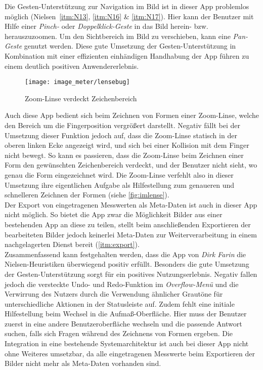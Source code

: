 Die Gesten-Unterstützung zur Navigation im Bild ist in dieser App problemlos möglich (Nielsen~\autoref{itm:N13}, \autoref{itm:N16} \& \autoref{itm:N17}).
Hier kann der Benutzer mit Hilfe einer \emph{Pinch-} oder \emph{Doppelklick-Geste} in das Bild herein- bzw. herauszuzoomen.
Um den Sichtbereich im Bild zu verschieben, kann eine \emph{Pan-Geste} genutzt werden.
Diese gute Umsetzung der Gesten-Unterstützung in Kombination mit einer effizienten einhändigen Handhabung der App führen zu einem deutlich positiven Anwendererlebnis.

\begin{wrapfigure}{R}{0.5\textwidth}
  \centering
  \texttt{[image: image\_meter/lensebug]}
  \caption{Zoom-Linse verdeckt Zeichenbereich}
  \label{fig:imlense}
\end{wrapfigure}

Auch diese App bedient sich beim Zeichnen von Formen einer Zoom-Linse, welche den Bereich um die Fingerposition vergrößert darstellt.
Negativ fällt bei der Umsetzung dieser Funktion jedoch auf, dass die Zoom-Linse statisch in der oberen linken Ecke angezeigt wird, und sich bei einer Kollision mit dem Finger nicht bewegt.
So kann es passieren, dass die Zoom-Linse beim Zeichnen einer Form den gewünschten Zeichenbereich verdeckt, und der Benutzer nicht sieht, wo genau die Form eingezeichnet wird.
Die Zoom-Linse verfehlt also in dieser Umsetzung ihre eigentlichen Aufgabe als Hilfestellung zum genaueren und schnelleren Zeichnen der Formen (siehe \autoref{fig:imlense}). \\

Der Export von eingetragenen Messwerten als Meta-Daten ist auch in dieser App nicht möglich.
So bietet die App zwar die Möglichkeit Bilder aus einer bestehenden App an diese zu teilen, stellt beim anschließenden Exportieren der bearbeiteten Bilder jedoch keinerlei Meta-Daten zur Weiterverarbeitung in einem nachgelagerten Dienst bereit (\autoref{itm:export}). \\

Zusammenfassend kann festgehalten werden, dass die App \im{} von \emph{Dirk Farin} die Nielsen-Heuristiken überwiegend positiv erfüllt.
Besonders die gute Umsetzung der Gesten-Unterstützung sorgt für ein positives Nutzungserlebnis.
Negativ fallen jedoch die versteckte Undo- und Redo-Funktion im \emph{Overflow-Menü} und die Verwirrung des Nutzers durch die Verwendung ähnlicher Grautöne für unterschiedliche Aktionen in der Statusleiste auf.
Zudem fehlt eine initiale Hilfestellung beim Wechsel in die Aufmaß-Oberfläche.
Hier muss der Benutzer zuerst in eine andere Benutzeroberfläche wechseln und die passende Antwort suchen, falls sich Fragen während des Zeichnens von Formen ergeben.
Die Integration in eine bestehende Systemarchitektur ist auch bei dieser App nicht ohne Weiteres umsetzbar, da alle eingetragenen Messwerte beim Exportieren der Bilder nicht mehr als Meta-Daten vorhanden sind.
